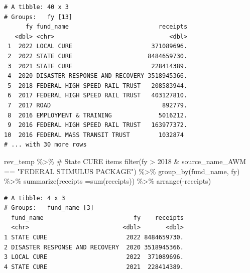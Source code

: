 \documentclass[
  letterpaper,
  DIV=11,
  numbers=noendperiod]{scrreport}
\newenvironment{Shaded}{\begin{snugshade}}{\end{snugshade}}
\newcommand{\AttributeTok}[1]{\textcolor[rgb]{0.40,0.45,0.13}{#1}}
\newcommand{\CommentTok}[1]{\textcolor[rgb]{0.37,0.37,0.37}{#1}}
\newcommand{\DecValTok}[1]{\textcolor[rgb]{0.68,0.00,0.00}{#1}}
\newcommand{\FunctionTok}[1]{\textcolor[rgb]{0.28,0.35,0.67}{#1}}
\newcommand{\NormalTok}[1]{\textcolor[rgb]{0.00,0.23,0.31}{#1}}
\newcommand{\SpecialCharTok}[1]{\textcolor[rgb]{0.37,0.37,0.37}{#1}}
\newcommand{\StringTok}[1]{\textcolor[rgb]{0.13,0.47,0.30}{#1}}
\begin{document}
\begin{verbatim}
# A tibble: 40 x 3
# Groups:   fy [13]
      fy fund_name                         receipts
   <dbl> <chr>                                <dbl>
 1  2022 LOCAL CURE                      371089696.
 2  2022 STATE CURE                     8484659730.
 3  2021 STATE CURE                      228414389.
 4  2020 DISASTER RESPONSE AND RECOVERY 3518945366.
 5  2018 FEDERAL HIGH SPEED RAIL TRUST   208583944.
 6  2017 FEDERAL HIGH SPEED RAIL TRUST   403127810.
 7  2017 ROAD                               892779.
 8  2016 EMPLOYMENT & TRAINING             5016212.
 9  2016 FEDERAL HIGH SPEED RAIL TRUST   163977372.
10  2016 FEDERAL MASS TRANSIT TRUST        1032874 
# ... with 30 more rows
\end{verbatim}

\begin{Shaded}
\begin{Highlighting}[]
\NormalTok{rev\_temp }\SpecialCharTok{\%\textgreater{}\%} \CommentTok{\# State CURE items}
  \FunctionTok{filter}\NormalTok{(fy }\SpecialCharTok{\textgreater{}} \DecValTok{2018} \SpecialCharTok{\&}\NormalTok{ source\_name\_AWM }\SpecialCharTok{==} \StringTok{"FEDERAL STIMULUS PACKAGE"}\NormalTok{) }\SpecialCharTok{\%\textgreater{}\%} 
  \FunctionTok{group\_by}\NormalTok{(fund\_name, fy) }\SpecialCharTok{\%\textgreater{}\%} 
  \FunctionTok{summarize}\NormalTok{(}\AttributeTok{receipts =}\FunctionTok{sum}\NormalTok{(receipts)) }\SpecialCharTok{\%\textgreater{}\%} 
  \FunctionTok{arrange}\NormalTok{(}\SpecialCharTok{{-}}\NormalTok{receipts)}
\end{Highlighting}
\end{Shaded}

\begin{verbatim}
# A tibble: 4 x 3
# Groups:   fund_name [3]
  fund_name                         fy    receipts
  <chr>                          <dbl>       <dbl>
1 STATE CURE                      2022 8484659730.
2 DISASTER RESPONSE AND RECOVERY  2020 3518945366.
3 LOCAL CURE                      2022  371089696.
4 STATE CURE                      2021  228414389.
\end{verbatim}
\end{document}
